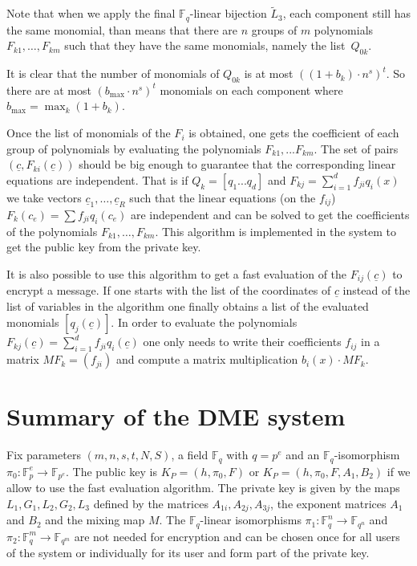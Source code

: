 \documentclass[12pt,a4paper]{amsart}
\theoremstyle{remark}
\theoremstyle{definition}
\newcommand\gfq{\mathbb{F}_q}
\begin{document}
Note that when we apply the final $\gfq$-linear bijection $\tilde{L}_3$,
each component still has the same monomial, than means that there are $n$ groups
of $m$ polynomials $F_{k1},\dots,F_{km}$ such that they have the same monomials,
namely the list~$Q_{0k}$.

It is clear that the number of monomials of $Q_{0k}$ is at most $((1+b_k)\cdot n^s)^t$.
So there are at most $(b_{\max}\cdot n^s)^t$ monomials on each component where $b_{\max}=\max_k(1+b_k)$.

Once the list of monomials of the $F_i$ is obtained, one gets the coefficient 
of each group of polynomials by evaluating the polynomials
$F_{k1},...F_{km}$. The set of pairs $(\underline{c},F_{ki}(\underline{c}))$ should be
big enough to guarantee that the corresponding linear equations are independent. 
That is if $Q_k=[q_1...q_d]$ and $F_{kj}=\sum_{i=1}^d f_{ji} q_i(x)$ 
we take vectors $\underline{c}_1,\dots,\underline{c}_R$ such that the linear equations (on the $f_{ij}$)
$F_k(c_e )=\sum f_{ji} q_i(c_e)$
are independent and can be solved to get the coefficients of the polynomials $F_{k1},\dots,F_{km}$.
This algorithm is implemented in the system to get the public key from the private key.
 
It is also possible to use this algorithm to get a fast evaluation of the $F_{ij}(\underline{c})$ to  encrypt a  message. 
If one starts with the list of the coordinates of $\underline{c}$ instead of the list of variables 
in the algorithm one finally obtains a list of the evaluated monomials $[q_j(\underline{c})]$. 
In order to evaluate the polynomials $F_{kj}(\underline{c})=\sum_{i=1}^d f_{ji} q_i(\underline{c})$
one only needs to write their coefficients $f_{ij}$  in a matrix $MF_k=(f_{ji})$ and compute a matrix multiplication $b_i(x)\cdot MF_k$.

\section*{Summary of the DME system}
Fix parameters $(m,n,s,t,N,S)$, a field $\gfq$ with $q=p^e$ and an $\mathbb{F}_q$-isomorphism 
$\pi_0:\mathbb{F}_p^e \to\mathbb{F}_{p^e }$.
The public key is $K_P=(h,\pi_0,F)$ or  $K_P=(h,\pi_0,F,A_1,B_2)$ if we allow to use the fast evaluation algorithm.
The private key is given by the maps $L_1,G_1,L_2,G_2,L_3$ defined by the matrices 
$A_{1i},A_{2j},A_{3j}$, the exponent matrices $A_1$ and $B_2$ and the mixing map $M$. 
The $\mathbb{F}_q$-linear isomorphisms $\pi_1:\mathbb{F}_q^n\to\mathbb{F}_{q^n}$
and $\pi_2:\mathbb{F}_q^m\to\mathbb{F}_{q^m}$ are not needed for encryption and can be chosen once 
for all users of the system or individually for its user and form part of the private key.
\end{document}
